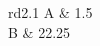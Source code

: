 \documentclass[usedcolumn]{mn2e}
\begin{document}
\begin{tabular}{rd{2.1}}
A & 1.5 \\
B & 22.25 \\
\end{tabular}
\end{document}
